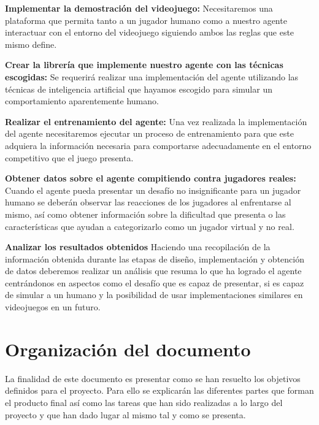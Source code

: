 \begin{enumerate}
	
	{\item {\bf Implementar la demostración del videojuego:}
		Necesitaremos una plataforma que permita tanto a un jugador humano como a nuestro agente interactuar con el entorno del videojuego siguiendo ambos las reglas que este mismo define.
	}

	{\item {\bf Crear la librería que implemente nuestro agente con las técnicas escogidas:}
		Se requerirá realizar una implementación del agente utilizando las técnicas de inteligencia artificial que hayamos escogido para simular un comportamiento aparentemente humano.
	}

	{\item {\bf Realizar el entrenamiento del agente:}
		Una vez realizada la implementación del agente necesitaremos ejecutar un proceso de entrenamiento para que este adquiera la información necesaria para comportarse adecuadamente en el entorno competitivo que el juego presenta.
	}

	{\item {\bf Obtener datos sobre el agente compitiendo contra jugadores reales:}
		Cuando el agente pueda presentar un desafío no insignificante para un jugador humano se deberán observar las reacciones de los jugadores al enfrentarse al mismo, así como obtener información sobre la dificultad que presenta o las características que ayudan a categorizarlo como un jugador virtual y no real.
	}

	{\item {\bf Analizar los resultados obtenidos}
		Haciendo una recopilación de la información obtenida durante las etapas de diseño, implementación y obtención de datos deberemos realizar un análisis que resuma lo que ha logrado el agente centrándonos en aspectos como el desafío que es capaz de presentar, si es capaz de simular a un humano y la posibilidad de usar implementaciones similares en videojuegos en un futuro.
	}
	
\end{enumerate}

\section{Organización del documento}

La finalidad de este documento es presentar como se han resuelto los objetivos definidos para el proyecto. Para ello se explicarán las diferentes partes que forman el producto final así como las tareas que han sido realizadas a lo largo del proyecto y que han dado lugar al mismo tal y como se presenta.



